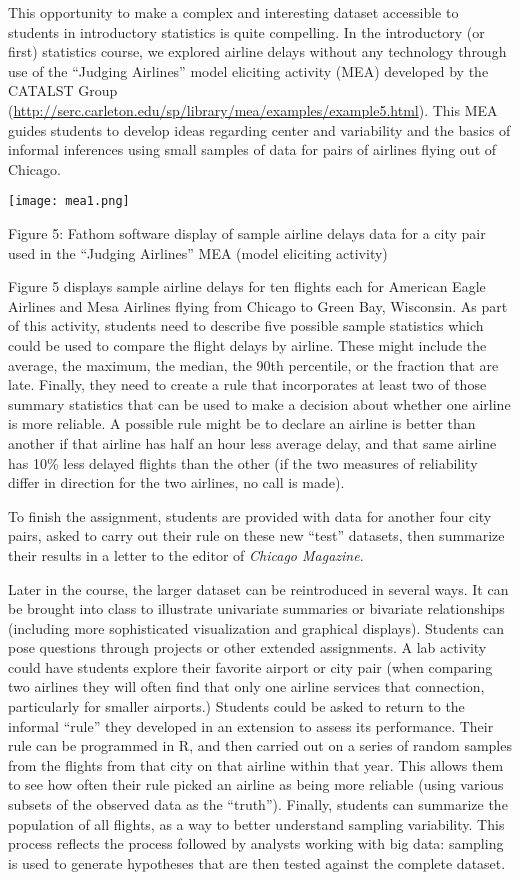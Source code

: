 \documentclass[]{article}
\begin{document}
This opportunity to make a complex and interesting dataset accessible to
students in introductory statistics is quite compelling. In the
introductory (or first) statistics course, we explored airline delays
without any technology through use of the ``Judging Airlines'' model
eliciting activity (MEA) developed by the CATALST Group
(\url{http://serc.carleton.edu/sp/library/mea/examples/example5.html}).
This MEA guides students to develop ideas regarding center and
variability and the basics of informal inferences using small samples of
data for pairs of airlines flying out of Chicago.

\texttt{[image: mea1.png]}

Figure 5: Fathom software display of sample airline delays data for a
city pair used in the ``Judging Airlines'' MEA (model eliciting
activity)

Figure 5 displays sample airline delays for ten flights each for
American Eagle Airlines and Mesa Airlines flying from Chicago to Green
Bay, Wisconsin. As part of this activity, students need to describe five
possible sample statistics which could be used to compare the flight
delays by airline. These might include the average, the maximum, the
median, the 90th percentile, or the fraction that are late. Finally,
they need to create a rule that incorporates at least two of those
summary statistics that can be used to make a decision about whether one
airline is more reliable. A possible rule might be to declare an airline
is better than another if that airline has half an hour less average
delay, and that same airline has 10\% less delayed flights than the
other (if the two measures of reliability differ in direction for the
two airlines, no call is made).

To finish the assignment, students are provided with data for another
four city pairs, asked to carry out their rule on these new ``test''
datasets, then summarize their results in a letter to the editor of
\emph{Chicago Magazine}.

Later in the course, the larger dataset can be reintroduced in several
ways. It can be brought into class to illustrate univariate summaries or
bivariate relationships (including more sophisticated visualization and
graphical displays). Students can pose questions through projects or
other extended assignments. A lab activity could have students explore
their favorite airport or city pair (when comparing two airlines they
will often find that only one airline services that connection,
particularly for smaller airports.) Students could be asked to return to
the informal ``rule'' they developed in an extension to assess its
performance. Their rule can be programmed in R, and then carried out on
a series of random samples from the flights from that city on that
airline within that year. This allows them to see how often their rule
picked an airline as being more reliable (using various subsets of the
observed data as the ``truth''). Finally, students can summarize the
population of all flights, as a way to better understand sampling
variability. This process reflects the process followed by analysts
working with big data: sampling is used to generate hypotheses that are
then tested against the complete dataset.
\end{document}
